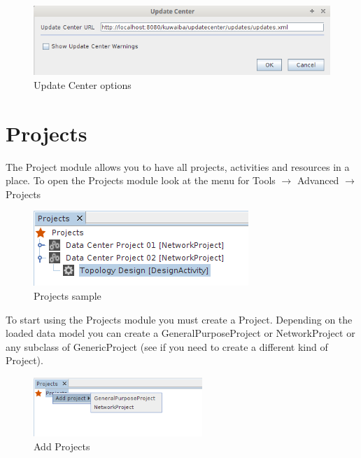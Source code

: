 \documentclass[a4paper]{article}
\begin{document}
		\begin{figure}[h!]
			\centering
			\includegraphics[width=0.7\linewidth]{img/update_center.png}
			\caption{Update Center options}
			\label{fig:update_center_options}
		\end{figure}		
		
		\newpage		
		\section{Projects}\label{sec:projects}
		
			The Project module allows you to have all projects, activities and resources in a place. To open the Projects module look at the menu for Tools $\rightarrow$ Advanced $\rightarrow$ Projects
			\newline
			
			\begin{figure}[h!]
				\centering
				\includegraphics[width=0.5\linewidth]{img/projects.png}
				\caption{Projects sample}
				\label{fig:projects}
		    \end{figure}
		    
		    To start using the Projects module you must create a Project. Depending on the loaded data model you can create a  GeneralPurposeProject or NetworkProject or any subclass of GenericProject (see \textbf{} if you need to create a different kind  of Project).
		    \newline
		    
		    \begin{figure}[h!]
		    	\centering
		    	\includegraphics[width=0.5\linewidth]{img/projects_actions.png}
		    	\caption{Add Projects}	    
		    	\label{fig:projects_actions}
		    \end{figure}
		    
\end{document}
